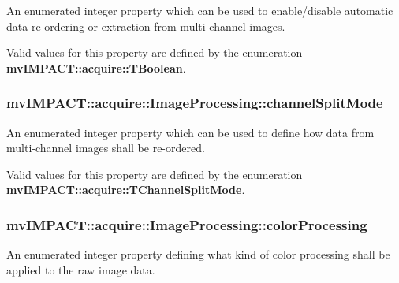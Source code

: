 An enumerated integer property which can be used to enable/disable automatic data re-\/ordering or extraction from multi-\/channel images. 

Valid values for this property are defined by the enumeration {\bfseries mv\+I\+M\+P\+A\+C\+T\+::acquire\+::\+T\+Boolean}. \hypertarget{classmv_i_m_p_a_c_t_1_1acquire_1_1_image_processing_a29e6579bdae98ea9fe26b5f982b8cf24}{
\subsubsection[{channel\+Split\+Mode}]{ mv\+I\+M\+P\+A\+C\+T\+::acquire\+::\+Image\+Processing\+::channel\+Split\+Mode}}\label{classmv_i_m_p_a_c_t_1_1acquire_1_1_image_processing_a29e6579bdae98ea9fe26b5f982b8cf24}


An enumerated integer property which can be used to define how data from multi-\/channel images shall be re-\/ordered. 

Valid values for this property are defined by the enumeration {\bfseries mv\+I\+M\+P\+A\+C\+T\+::acquire\+::\+T\+Channel\+Split\+Mode}. \hypertarget{classmv_i_m_p_a_c_t_1_1acquire_1_1_image_processing_af8773a44e43169a2bdb68b402f4eafd0}{
\subsubsection[{color\+Processing}]{ mv\+I\+M\+P\+A\+C\+T\+::acquire\+::\+Image\+Processing\+::color\+Processing}}\label{classmv_i_m_p_a_c_t_1_1acquire_1_1_image_processing_af8773a44e43169a2bdb68b402f4eafd0}


An enumerated integer property defining what kind of color processing shall be applied to the raw image data. 

